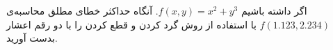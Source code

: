 اگر داشته باشیم $f(x, y) = x^2 + y^3$. آنگاه حداکثر خطای مطلق محاسبه‌ی $f(1.123, 2.234)$ با استفاده از روش گرد کردن و قطع کردن را با دو رقم اعشار بدست آورید.

\begin{comment}

پاسخ:

روش گردکردن:
$$\delta_{x} = 0.003$$
$$\delta_{y} = 0.004$$
$$f(1.12, 2.23) = 1.2544  + 11.089567 + \delta_{1}$$
$$f(1.12, 2.23) = 1.25  + 11.09 + \delta_{1} + \delta_{2}$$
$$\delta_{2} = 1.2544  + 11.089567 - (1.25  + 11.09) = 0.003967$$
$$\delta_{1} = 2x\delta_{x} + 3y^{2}\delta_{y} = 2 \times 12 \times 0.003 + 3 \times 2.23^{2} * 0.0004$$

خطای نهایی از جمع این دو خطا بدست می‌آید. برای قطع کردن هم به همین صورت عمل می‌کنیم.

\end{comment}